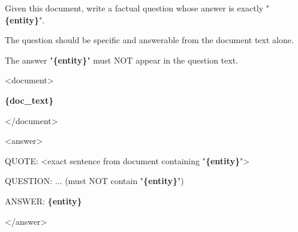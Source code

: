 \begin{tcolorbox}[colback=white, colframe=my-green, coltitle=black, parskip=5mm, title=\textbf{Web Seed Question}, halign=flush left, enhanced, breakable, skin first=enhanced, skin middle=enhanced, skin last=enhanced]
\begin{scriptsize}
\ttfamily
\setlength{\parindent}{0pt}
Given this document, write a factual question whose answer is exactly "\textcolor{my-green}{\textbf{\{entity\}}}".\par
The question should be specific and answerable from the document text alone.\par
The answer "\textcolor{my-green}{\textbf{\{entity\}}}" must NOT appear in the question text.\par
\mbox{}\par
\textless{}document\textgreater{}\par
\textcolor{my-green}{\textbf{\{doc\_text\}}}\par
\textless{}/document\textgreater{}\par
\mbox{}\par
\textless{}answer\textgreater{}\par
QUOTE: \textless{}exact sentence from document containing "\textcolor{my-green}{\textbf{\{entity\}}}"\textgreater{}\par
QUESTION: ... (must NOT contain "\textcolor{my-green}{\textbf{\{entity\}}}")\par
ANSWER: \textcolor{my-green}{\textbf{\{entity\}}}\par
\textless{}/answer\textgreater{}\par
\end{scriptsize}
\end{tcolorbox}

